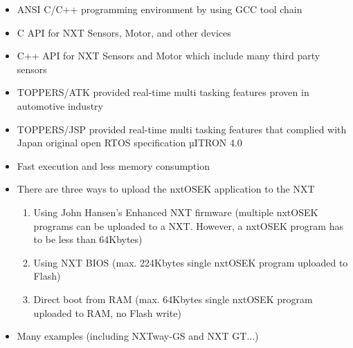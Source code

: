 \begin{itemize}
\item ANSI C/C++ programming environment by using GCC tool chain

    \item C API for NXT Sensors, Motor, and other devices
    \item C++ API for NXT Sensors and Motor which include many third party sensors
    \item TOPPERS/ATK provided real-time multi tasking features proven in automotive industry
    \item TOPPERS/JSP provided real-time multi tasking features that complied with Japan original open RTOS specification µITRON 4.0
    \item Fast execution and less memory consumption
    \item There are three ways to upload the nxtOSEK application to the NXT
     \begin{enumerate}
	\item  Using John Hansen's Enhanced NXT firmware
		(multiple nxtOSEK programs can be uploaded to a NXT. However, a nxtOSEK program has to be less than 64Kbytes)
	\item Using NXT BIOS (max. 224Kbytes single nxtOSEK program uploaded to Flash)
	\item Direct boot from RAM (max. 64Kbytes single nxtOSEK program uploaded to RAM, no Flash write)
	\end{enumerate}
    \item Many examples (including NXTway-GS and NXT GT...)
\end{itemize}


